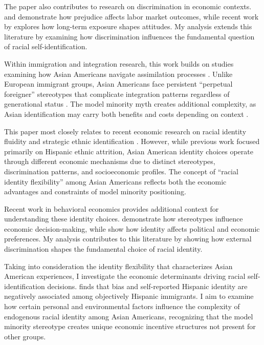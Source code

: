 The paper also contributes to research on discrimination in economic contexts. \textcite{bertrandAreEmilyGreg2004} and \textcite{charlesPrejudiceWagesEmpirical2008} demonstrate how prejudice affects labor market outcomes, while recent work by \textcite{bursztynImmigrantNextDoor2022} explores how long-term exposure shapes attitudes. My analysis extends this literature by examining how discrimination influences the fundamental question of racial self-identification.

Within immigration and integration research, this work builds on studies examining how Asian Americans navigate assimilation processes \autocite{abramitzkyCulturalAssimilationAge2016,abramitzkyNationImmigrantsAssimilation2014}. Unlike European immigrant groups, Asian Americans face persistent ``perpetual foreigner'' stereotypes that complicate integration patterns regardless of generational status \autocite{foukaImmigrantsAmericansRace2022}. The model minority myth creates additional complexity, as Asian identification may carry both benefits and costs depending on context \autocite{mengIntermarriageEconomicAssimilation2005}.

This paper most closely relates to recent economic research on racial identity fluidity and strategic ethnic identification \autocite{hadah2024hispanicidentity, antmanEthnicAttritionObserved2016,antmanIncentivesIdentifyRacial2015,antmanAmericanIndianCasinos2021}. However, while previous work focused primarily on Hispanic ethnic attrition, Asian American identity choices operate through different economic mechanisms due to distinct stereotypes, discrimination patterns, and socioeconomic profiles. The concept of ``racial identity flexibility'' among Asian Americans reflects both the economic advantages and constraints of model minority positioning.

Recent work in behavioral economics provides additional context for understanding these identity choices. \textcite{bordaloStereotypes2016} demonstrate how stereotypes influence economic decision-making, while \textcite{bonomiIdentityBeliefsPolitical2021} show how identity affects political and economic preferences. My analysis contributes to this literature by showing how external discrimination shapes the fundamental choice of racial identity.

Taking into consideration the identity flexibility that characterizes Asian American experiences, I investigate the economic determinants driving racial self-identification decisions. \textcite{hadah2024hispanicidentity} finds that bias and self-reported Hispanic identity are negatively associated among objectively Hispanic immigrants. I aim to examine how certain personal and environmental factors influence the complexity of endogenous racial identity among Asian Americans, recognizing that the model minority stereotype creates unique economic incentive structures not present for other groups.

